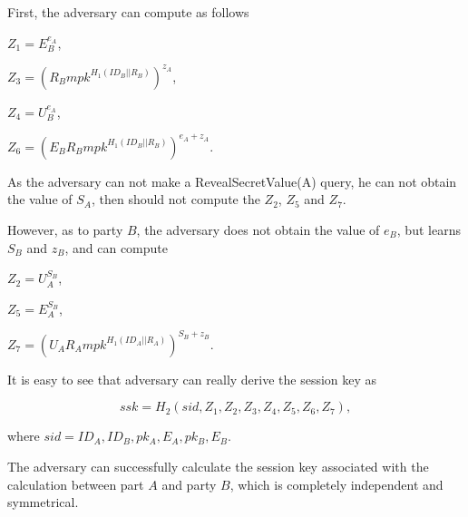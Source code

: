 \documentclass[final,1p,times,twocolumn]{elsarticle}
\begin{document}
First, the adversary can  compute as follows

\vspace{0.1cm}

$Z_{1}=E_{B}^{e_{A}}$,

\vspace{0.1cm}

$Z_{3}=(R_{B}mpk^{H_{1}(ID_{B}||R_{B})})^{z_{A}}$,

\vspace{0.1cm}

$Z_{4}=U_{B}^{e_{A}}$,

\vspace{0.1cm}

$Z_{6}=(E_{B}R_{B}mpk^{H_{1}(ID_{B}||R_{B})})^{e_{A}+z_{A}}$.

\vspace{0.1cm}

As the adversary can not make a RevealSecretValue(A) query, he can not obtain the value of $S_{A}$, then should not compute the $Z_{2}$, $Z_{5}$ and $Z_{7}$.

\vspace{0.1cm}

However, as to party $B$, the adversary does not obtain the value of $e_{B}$, but learns $S_{B}$ and $z_{B}$, and can compute

\vspace{0.1cm}

$Z_{2}=U_{A}^{S_{B}}$,

\vspace{0.1cm}

$Z_{5}=E_{A}^{S_{B}}$,

\vspace{0.1cm}

$Z_{7}=(U_{A}R_{A}mpk^{H_{1}(ID_{A}||R_{A})})^{S_{B}+z_{B}}$.

\vspace{0.1cm}

It is easy to see that adversary can really derive the session key as

\vspace{0.1cm}

 $$ssk=H_{2}(sid,Z_{1},Z_{2},Z_{3},Z_{4},Z_{5},Z_{6},Z_{7}),$$

 \vspace{0.1cm}

 where $sid=ID_{A},ID_{B},pk_{A},E_{A},pk_{B},E_{B}$.

 \vspace{0.1cm}

The adversary can successfully calculate the session key associated with the calculation between part $A$ and party $B$, which is completely independent and symmetrical.
 \vspace{0.3cm}
\end{document}
